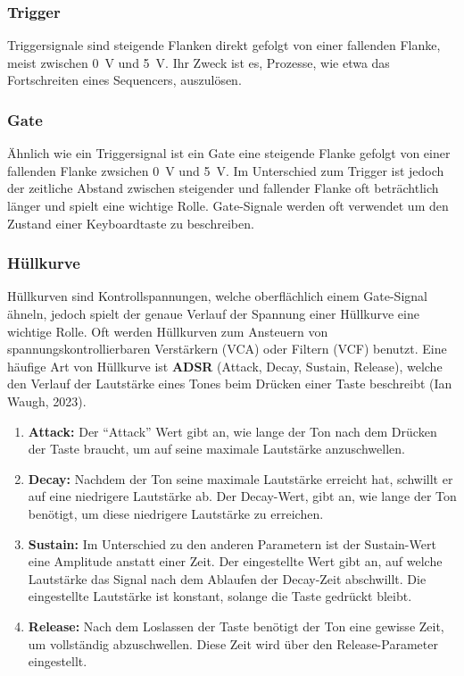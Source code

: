 \subsubsection{Trigger}
\label{sec:org76740d7}
Triggersignale sind steigende Flanken direkt gefolgt von einer fallenden Flanke, meist zwischen \SI{0}{\volt} und \SI{5}{\volt}. Ihr Zweck ist es, Prozesse, wie etwa das Fortschreiten eines Sequencers, auszulösen.

\subsubsection{Gate}
\label{sec:orgecdb90b}
Ähnlich wie ein Triggersignal ist ein Gate eine steigende Flanke gefolgt von einer fallenden Flanke zwsichen \SI{0}{\volt} und \SI{5}{\volt}. Im Unterschied zum Trigger ist jedoch der zeitliche Abstand zwischen steigender und fallender Flanke oft beträchtlich länger und spielt eine wichtige Rolle. Gate-Signale werden oft verwendet um den Zustand einer Keyboardtaste zu beschreiben.

\subsubsection{Hüllkurve}
\label{sec:orge41ff72}
Hüllkurven sind Kontrollspannungen, welche oberflächlich einem Gate-Signal ähneln, jedoch spielt der genaue Verlauf der Spannung einer Hüllkurve eine wichtige Rolle. Oft werden Hüllkurven zum Ansteuern von spannungskontrollierbaren Verstärkern (VCA) oder Filtern (VCF) benutzt. Eine häufige Art von Hüllkurve ist \textbf{ADSR} (Attack, Decay, Sustain, Release), welche den Verlauf der Lautstärke eines Tones beim Drücken einer Taste beschreibt (Ian Waugh, 2023).

\begin{enumerate}
\item \textbf{Attack:}
\label{sec:orgbb5b55f}
Der "`Attack"' Wert gibt an, wie lange der Ton nach dem Drücken der Taste braucht, um auf seine maximale Lautstärke anzuschwellen.

\item \textbf{Decay:}
\label{sec:org924f021}
Nachdem der Ton seine maximale Lautstärke erreicht hat, schwillt er auf eine niedrigere Lautstärke ab. Der Decay-Wert, gibt an, wie lange der Ton benötigt, um diese niedrigere Lautstärke zu erreichen.

\item \textbf{Sustain:}
\label{sec:orgb580a57}
Im Unterschied zu den anderen Parametern ist der Sustain-Wert eine Amplitude anstatt einer Zeit. Der eingestellte Wert gibt an, auf welche Lautstärke das Signal nach dem Ablaufen der Decay-Zeit abschwillt. Die eingestellte Lautstärke ist konstant, solange die Taste gedrückt bleibt.

\item \textbf{Release:}
\label{sec:org9b8df92}
Nach dem Loslassen der Taste benötigt der Ton eine gewisse Zeit, um vollständig abzuschwellen.  Diese Zeit wird über den Release-Parameter eingestellt.
\end{enumerate}


